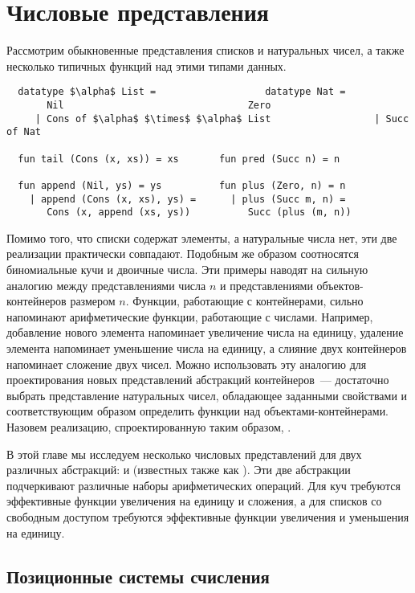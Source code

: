\chapter{Числовые представления}
\label{ch:9}

Рассмотрим обыкновенные представления списков и натуральных чисел, а
также несколько типичных функций над этими типами данных.
\begin{lstlisting}
  datatype $\alpha$ List =                   datatype Nat =
       Nil                                Zero
     | Cons of $\alpha$ $\times$ $\alpha$ List                  | Succ of Nat

  fun tail (Cons (x, xs)) = xs       fun pred (Succ n) = n

  fun append (Nil, ys) = ys          fun plus (Zero, n) = n
    | append (Cons (x, xs), ys) =      | plus (Succ m, n) =
       Cons (x, append (xs, ys))          Succ (plus (m, n))
\end{lstlisting}
Помимо того, что списки содержат элементы, а натуральные числа нет,
эти две реализации практически совпадают. Подобным же образом
соотносятся биномиальные кучи и двоичные числа. Эти примеры наводят на
сильную аналогию между представлениями числа $n$ и представлениями
объектов-контейнеров размером $n$. Функции, работающие с контейнерами,
сильно напоминают арифметические функции, работающие с
числами. Например, добавление нового элемента напоминает увеличение
числа на единицу, удаление элемента напоминает уменьшение числа на
единицу, а слияние двух контейнеров напоминает сложение двух
чисел. Можно использовать эту аналогию для проектирования новых
представлений абстракций контейнеров~--- достаточно выбрать
представление натуральных чисел, обладающее заданными свойствами и
соответствующим образом определить функции над
объектами-контейнерами. Назовем реализацию, спроектированную таким
образом, .

В этой главе мы исследуем несколько числовых представлений для двух
различных абстракций:  и  (известных также как ). Эти две абстракции подчеркивают различные наборы
арифметических операций. Для куч требуются эффективные функции
увеличения на единицу и сложения, а для списков со свободным доступом
требуются эффективные функции увеличения и уменьшения на единицу.

\section{Позиционные системы счисления}
\label{sc:9.1}

